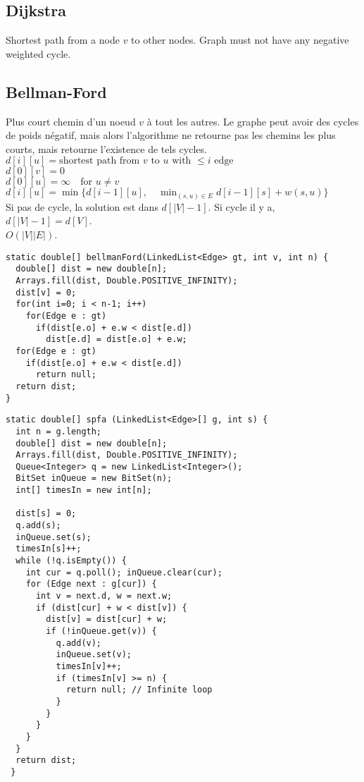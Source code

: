 \subsection{Dijkstra}
Shortest path from a node $v$ to other nodes. Graph must not have any negative weighted cycle.\\


\subsection{Bellman-Ford\label{BellmanFord}}
Plus court chemin d'un noeud $v$ à tout les autres. Le graphe peut avoir des cycles de poids négatif, mais alors l'algorithme ne retourne pas les chemins les plus courts, mais retourne l'existence de tels cycles.\\
$d[i][u] = \text{shortest path from $v$ to $u$ with $\leq i$ edge}$\\
$d[0][v] = 0$ \\
$d[0][u] = \infty \quad \text{for $u \neq v$}$\\
$d[i][u] = \min \{ 
d[i - 1][u], \quad
\min_{(s, u) \in E} d[i - 1][s] + w(s, u) \}$\\
Si pas de cycle, la solution est dans $d[|V|-1]$. Si cycle il y a, $d[|V|-1]=d[V]$.\\
$O(|V||E|)$.\\

\begin{lstlisting}
static double[] bellmanFord(LinkedList<Edge> gt, int v, int n) {
  double[] dist = new double[n];
  Arrays.fill(dist, Double.POSITIVE_INFINITY);
  dist[v] = 0;
  for(int i=0; i < n-1; i++)
    for(Edge e : gt)
      if(dist[e.o] + e.w < dist[e.d])
        dist[e.d] = dist[e.o] + e.w;
  for(Edge e : gt)
    if(dist[e.o] + e.w < dist[e.d])
      return null;
  return dist;
}
\end{lstlisting}
\begin{lstlisting}
static double[] spfa (LinkedList<Edge>[] g, int s) {
  int n = g.length;
  double[] dist = new double[n];
  Arrays.fill(dist, Double.POSITIVE_INFINITY);
  Queue<Integer> q = new LinkedList<Integer>();
  BitSet inQueue = new BitSet(n);
  int[] timesIn = new int[n];

  dist[s] = 0;
  q.add(s);
  inQueue.set(s);
  timesIn[s]++;
  while (!q.isEmpty()) {
    int cur = q.poll(); inQueue.clear(cur);
    for (Edge next : g[cur]) {
      int v = next.d, w = next.w;
      if (dist[cur] + w < dist[v]) {
        dist[v] = dist[cur] + w;
        if (!inQueue.get(v)) {
          q.add(v);
          inQueue.set(v);
          timesIn[v]++;
          if (timesIn[v] >= n) {
            return null; // Infinite loop
          }
        }
      }
    }
  }
  return dist;
 }
\end{lstlisting}
